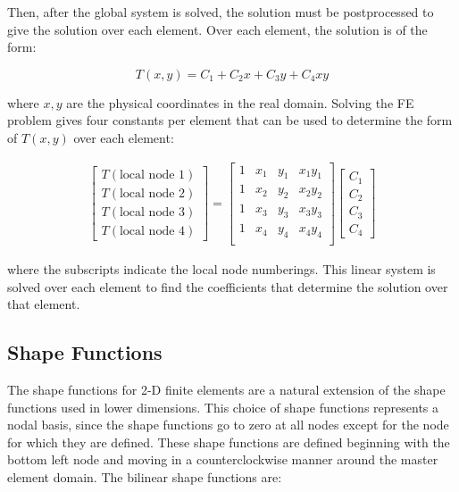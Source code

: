 \documentclass[10pt]{article}
\begin{document}
Then, after the global system is solved, the solution must be postprocessed to give the solution over each element. Over each element, the solution is of the form:

\begin{equation}
T(x,y)=C_1+C_2x+C_3y+C_4xy
\end{equation}

where \(x,y\) are the physical coordinates in the real domain. Solving the FE problem gives four constants per element that can be used to determine the form of \(T(x,y)\) over each element:

\begin{equation}
\begin{aligned}
\begin{bmatrix}
T(\text{local node 1})\\T(\text{local node 2})\\T(\text{local node 3})\\T(\text{local node 4})
\end{bmatrix}=\begin{bmatrix}
1 & x_1 & y_1 & x_1y_1\\
1 & x_2 & y_2 & x_2y_2\\
1 & x_3 & y_3 & x_3y_3\\
1 & x_4 & y_4 & x_4y_4\\
\end{bmatrix}
\begin{bmatrix}
C_1\\C_2\\C_3\\C_4
\end{bmatrix}
\end{aligned}
\end{equation}

where the subscripts indicate the local node numberings. This linear system is solved over each element to find the coefficients that determine the solution over that element.

\subsection{Shape Functions}

The shape functions for 2-D finite elements are a natural extension of the shape functions used in lower dimensions. This choice of shape functions represents a nodal basis, since the shape functions go to zero at all nodes except for the node for which they are defined. These shape functions are defined beginning with the bottom left node and moving in a counterclockwise manner around the master element domain. The bilinear shape functions are:
\end{document}
